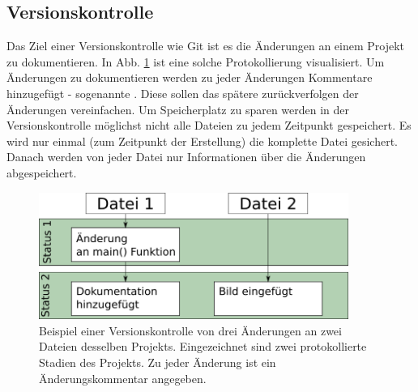 \subsection{Versionskontrolle}
Das Ziel einer Versionskontrolle wie Git ist es die Änderungen an einem Projekt zu dokumentieren. In Abb. \ref{fig:vers-kontrol}
ist eine solche Protokollierung visualisiert. Um Änderungen zu dokumentieren werden zu jeder Änderungen Kommentare hinzugefügt - sogenannte . Diese sollen das spätere zurückverfolgen der Änderungen vereinfachen. Um Speicherplatz zu sparen werden in der Versionskontrolle möglichst nicht alle Dateien zu jedem Zeitpunkt gespeichert. Es wird nur einmal (zum Zeitpunkt der Erstellung) die komplette Datei gesichert. Danach werden von jeder Datei nur Informationen über die Änderungen abgespeichert.
\begin{figure}[!h]
    \centering
    \includegraphics[width=0.9\textwidth]{Bilder/Versioncontrol.png}
    \caption{Beispiel einer Versionskontrolle von drei Änderungen an zwei Dateien desselben Projekts. Eingezeichnet sind zwei protokollierte Stadien des Projekts. Zu jeder Änderung ist ein Änderungskommentar angegeben.}
    \label{fig:vers-kontrol}
\end{figure}